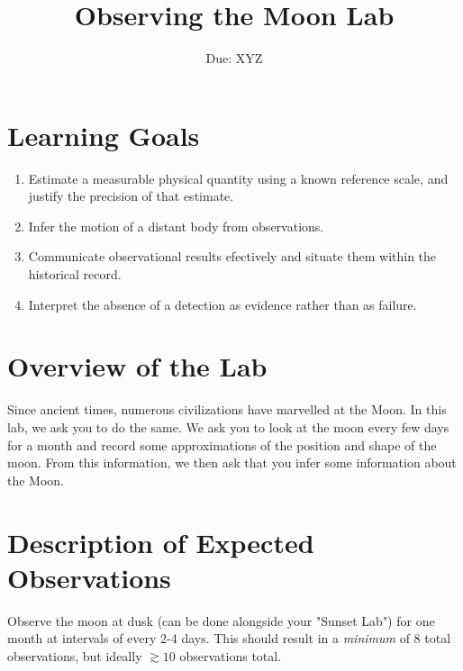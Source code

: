 \documentclass[11pt]{article}
\date{Due: XYZ}
\title{Observing the Moon Lab}
\begin{document}
\maketitle

\section*{Learning Goals}
\label{sec:orgb0b9823}
\begin{enumerate}
\item Estimate a measurable physical quantity using a known reference scale, and justify the precision of that estimate.
\item Infer the motion of a distant body from observations.
\item Communicate observational results efectively and situate them within the historical record.
\item Interpret the absence of a detection as evidence rather than as failure.
\end{enumerate}

\section*{Overview of the Lab}
\label{sec:org06f6255}
Since ancient times, numerous civilizations have marvelled at the Moon. In this lab, we ask you
to do the same. We ask you to look at the moon every few days for a month and record some
approximations of the position and shape of the moon. From this information, we then ask that
you infer some information about the Moon.

\section*{Description of Expected Observations}
\label{sec:org9daea9c}
Observe the moon at dusk (can be done alongside your "Sunset Lab") for one month
at intervals of every 2-4 days. This should result in a \emph{minimum} of 8 total observations,
but ideally \(\gtrsim10\) observations total.
\end{document}
